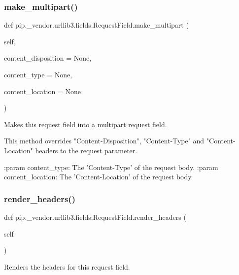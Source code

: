 \subsubsection{\texorpdfstring{make\+\_\+multipart()}{make\_multipart()}}
{\footnotesize\ttfamily def pip.\+\_\+vendor.\+urllib3.\+fields.\+Request\+Field.\+make\+\_\+multipart (\begin{DoxyParamCaption}\item[{}]{self,  }\item[{}]{content\+\_\+disposition = {\ttfamily None},  }\item[{}]{content\+\_\+type = {\ttfamily None},  }\item[{}]{content\+\_\+location = {\ttfamily None} }\end{DoxyParamCaption})}

\begin{DoxyVerb}Makes this request field into a multipart request field.

This method overrides "Content-Disposition", "Content-Type" and
"Content-Location" headers to the request parameter.

:param content_type:
    The 'Content-Type' of the request body.
:param content_location:
    The 'Content-Location' of the request body.\end{DoxyVerb}
 \mbox{\label{classpip_1_1__vendor_1_1urllib3_1_1fields_1_1RequestField_a86767d68b66029d734d1338c6c52bfeb}} 
\subsubsection{\texorpdfstring{render\+\_\+headers()}{render\_headers()}}
{\footnotesize\ttfamily def pip.\+\_\+vendor.\+urllib3.\+fields.\+Request\+Field.\+render\+\_\+headers (\begin{DoxyParamCaption}\item[{}]{self }\end{DoxyParamCaption})}

\begin{DoxyVerb}Renders the headers for this request field.
\end{DoxyVerb}
 

